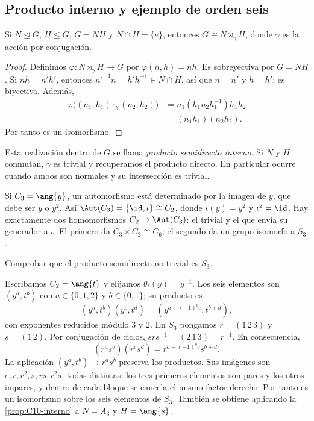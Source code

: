 \subsection{Producto interno y ejemplo de orden seis}
\begin{prop}\label{prop:C10-interno}
Si $N\trianglelefteq G$, $H\le G$, $G=NH$ y $N\cap H=\{e\}$, entonces $G\cong N\rtimes_\gamma H$, donde $\gamma$ es la acción por conjugación.
\end{prop}
\begin{proof}
Definimos $\varphi:N\rtimes_\gamma H\to G$ por $\varphi(n,h)=nh$. Es sobreyectiva por $G=NH$. Si $nh=n'h'$, entonces $n'^{-1}n=h'h^{-1}\in N\cap H$, así que $n=n'$ y $h=h'$; es biyectiva. Además,
\begin{align*}
\varphi\bigl((n_1,h_1)\cdot_\gamma(n_2,h_2)\bigr)
&=n_1(h_1n_2h_1^{-1})h_1h_2\\
&=(n_1h_1)(n_2h_2).
\end{align*}
Por tanto es un isomorfismo.
\end{proof}
Esta realización dentro de $G$ se llama \emph{producto semidirecto interno}. Si $N$ y $H$ conmutan, $\gamma$ es trivial y recuperamos el producto directo. En particular ocurre cuando ambos son normales y su intersección es trivial.

\begin{ejem}
Si $C_3=\ang{y}$, un automorfismo está determinado por la imagen de $y$, que debe ser $y$ o $y^2$. Así $\Aut(C_3)=\{\id,\iota\}\cong C_2$, donde $\iota(y)=y^2$ y $\iota^2=\id$. Hay exactamente dos homomorfismos $C_2\to\Aut(C_3)$: el trivial y el que envía su generador a $\iota$. El primero da $C_3\times C_2\cong C_6$; el segundo da un grupo isomorfo a $S_3$.
\end{ejem}
\begin{ejer}
Comprobar que el producto semidirecto no trivial es $S_3$.
\end{ejer}
\begin{sol}
Escribamos $C_2=\ang{t}$ y elijamos $\theta_t(y)=y^{-1}$. Los seis elementos son $(y^a,t^b)$ con $a\in\{0,1,2\}$ y $b\in\{0,1\}$; su producto es
\[
(y^a,t^b)(y^c,t^d)=(y^{a+(-1)^bc},t^{b+d}),
\]
con exponentes reducidos módulo $3$ y $2$. En $S_3$ pongamos $r=(1\,2\,3)$ y $s=(1\,2)$. Por conjugación de ciclos, $srs^{-1}=(2\,1\,3)=r^{-1}$. En consecuencia,
\[
(r^as^b)(r^cs^d)=r^{a+(-1)^bc}s^{b+d}.
\]
La aplicación $(y^a,t^b)\mapsto r^as^b$ preserva los productos. Sus imágenes son $e,r,r^2,s,rs,r^2s$, todas distintas: los tres primeros elementos son pares y los otros impares, y dentro de cada bloque se cancela el mismo factor derecho. Por tanto es un isomorfismo sobre los seis elementos de $S_3$. También se obtiene aplicando la \cref{prop:C10-interno} a $N=A_3$ y $H=\ang{s}$.
\end{sol}

